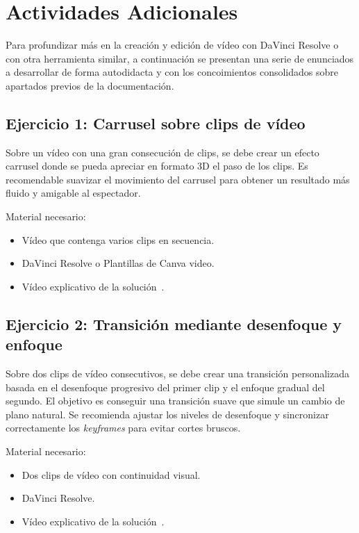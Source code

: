 \section{Actividades Adicionales}

Para profundizar más en la creación y edición de vídeo con DaVinci Resolve o con otra herramienta similar, a continuación se 
presentan una serie de enunciados a desarrollar de forma autodidacta y con los concoimientos consolidados sobre apartados previos de 
la documentación.

\subsection{Ejercicio 1: Carrusel sobre clips de vídeo}
Sobre un vídeo con una gran consecución de clips, se debe crear un efecto carrusel donde se pueda apreciar en formato 3D 
el paso de los clips. Es recomendable suavizar el movimiento del carrusel para obtener un resultado más fluido y amigable al 
espectador.

Material necesario:
\begin{itemize}
    \item Vídeo que contenga varios clips en secuencia.
    \item DaVinci Resolve o Plantillas de Canva video.
    \item Vídeo explicativo de la solución~\cite{carrusel}. 
\end{itemize}

\subsection{Ejercicio 2: Transición mediante desenfoque y enfoque}
Sobre dos clips de vídeo consecutivos, se debe crear una transición personalizada basada en el desenfoque progresivo del primer clip y el enfoque gradual del segundo. 
El objetivo es conseguir una transición suave que simule un cambio de plano natural. 
Se recomienda ajustar los niveles de desenfoque y sincronizar correctamente los \textit{keyframes} para evitar cortes bruscos.

Material necesario:
\begin{itemize}
    \item Dos clips de vídeo con continuidad visual.
    \item DaVinci Resolve.
    \item Vídeo explicativo de la solución~\cite{transicion-enfoque}. 
\end{itemize}

